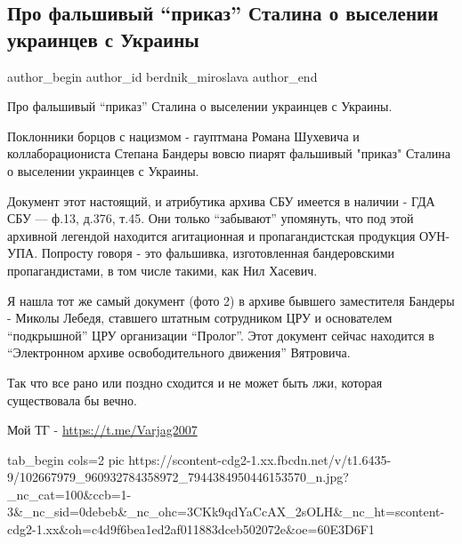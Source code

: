  
 
 
 
 
 
\subsection{Про фальшивый \enquote{приказ} Сталина о выселении украинцев с Украины}
\label{sec:06_06_2020.fb.berdnik_miroslava.1.prikaz_stalina_ukraincy_vyselenie_falshivka}
\ifcmt
 author_begin
   author_id berdnik_miroslava
 author_end
\fi

Про фальшивый \enquote{приказ} Сталина о выселении украинцев с Украины.

Поклонники борцов с нацизмом - гауптмана Романа Шухевича и коллаборациониста
Степана Бандеры вовсю пиарят фальшивый "приказ" Сталина о выселении украинцев с
Украины.

Документ этот настоящий, и атрибутика архива СБУ имеется в наличии - ГДА СБУ —
ф.13, д.376, т.45. Они только \enquote{забывают} упомянуть, что под этой архивной
легендой находится агитационная и пропагандистская продукция ОУН-УПА. Попросту
говоря - это фальшивка, изготовленная бандеровскими пропагандистами, в том
числе такими, как Нил Хасевич.

Я нашла тот же самый документ (фото 2) в архиве бывшего заместителя Бандеры -
Миколы Лебедя, ставшего штатным сотрудником ЦРУ и основателем \enquote{подкрышной} ЦРУ
организации \enquote{Пролог}. Этот документ сейчас находится в \enquote{Электронном архиве
освободительного движения} Вятровича.

Так что все рано или поздно сходится и не может быть лжи, которая существовала бы вечно.

Мой ТГ - \url{https://t.me/Varjag2007}

\ifcmt
  tab_begin cols=2
     pic https://scontent-cdg2-1.xx.fbcdn.net/v/t1.6435-9/102667979_960932784358972_7944384950446153570_n.jpg?_nc_cat=100&ccb=1-3&_nc_sid=0debeb&_nc_ohc=3CKk9qdYaCcAX_2sOLH&_nc_ht=scontent-cdg2-1.xx&oh=c4d9f6bea1ed2af011883dceb502072e&oe=60E3D6F1

